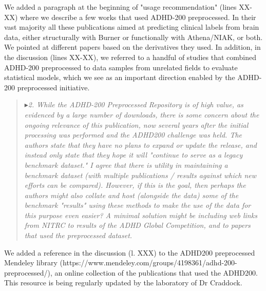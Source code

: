 \documentclass[authoryear,3p]{elsarticle}
\begin{document}
We added a paragraph at the beginning of "usage recommendation" (lines XX-XX) where we describe a few works that used ADHD-200 preprocessed. In their vast majority all these publications aimed at predicting clinical labels from brain data, either structurally with Burner or functionally with Athena/NIAK, or both. We pointed at different papers based on the derivatives they used. In addition, in the discussion (lines XX-XX), we referred to a handful of studies that combined ADHD-200 preprocessed to data samples from unrelated fields to evaluate statistical models, which we see as an important direction enabled by the ADHD-200 preprocessed initiative. 


\begin{quote}
$\blacktriangleright$\emph{2. While the ADHD-200 Preprocessed Repository is of high value, as evidenced by a large number of downloads, there is some concern about the ongoing relevance of this publication, now several years after the initial processing was performed and the ADHD200 challenge was held. The authors state that they have no plans to expand or update the release, and instead only state that they hope it will "continue to serve as a legacy benchmark dataset."  I agree that there is utility in maintaining a benchmark dataset (with multiple publications / results against which new efforts can be compared). However, if this is the goal, then perhaps the authors might also collate and host (alongside the data) some of the benchmark "results" using these methods to make the use of the data for this purpose even easier?  A minimal solution might be including web links from NITRC to results of the ADHD Global Competition, and to papers that used the preprocessed dataset.
}
\end{quote}

We added a reference in the discussion (l. XXX) to the ADHD200 preprocessed Mendeley library (https://www.mendeley.com/groups/4198361/adhd-200-preprocessed/), an online collection of the publications that used the ADHD200. This resource is being regularly updated by the laboratory of Dr Craddock. 
\end{document}
